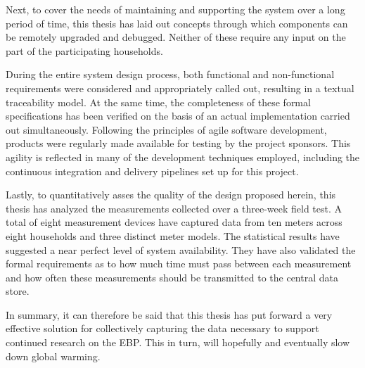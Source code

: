 Next, to cover the needs of maintaining and supporting the system over a long period of time, this thesis has laid out concepts through which components can be remotely upgraded and debugged. Neither of these require any input on the part of the participating households.

During the entire system design process, both functional and non-functional requirements were considered and appropriately called out, resulting in a textual traceability model. At the same time, the completeness of these formal specifications has been verified on the basis of an actual implementation carried out simultaneously. Following the principles of agile software development, products were regularly made available for testing by the project sponsors. This agility is reflected in many of the development techniques employed, including the continuous integration and delivery pipelines set up for this project.

Lastly, to quantitatively asses the quality of the design proposed herein, this thesis has analyzed the measurements collected over a three-week field test. A total of eight measurement devices have captured data from ten meters across eight households and three distinct meter models. The statistical results have suggested a near perfect level of system availability. They have also validated the formal requirements as to how much time must pass between each measurement and how often these measurements should be transmitted to the central data store.

In summary, it can therefore be said that this thesis has put forward a very effective solution for collectively capturing the data necessary to support continued research on the \acl{EBP}. This in turn, will hopefully and eventually slow down global warming. 
